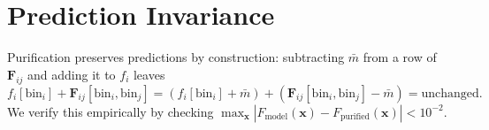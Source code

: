 \section{Prediction Invariance}

Purification preserves predictions by construction: subtracting $\bar{m}$ from a row of $\mathbf{F}_{ij}$ and adding it to $f_i$ leaves
\[
    f_i[\text{bin}_i] + \mathbf{F}_{ij}[\text{bin}_i, \text{bin}_j] = (f_i[\text{bin}_i] + \bar{m}) + (\mathbf{F}_{ij}[\text{bin}_i, \text{bin}_j] - \bar{m}) = \text{unchanged}.
\]
We verify this empirically by checking $\max_{\mathbf{x}} |F_{\text{model}}(\mathbf{x}) - F_{\text{purified}}(\mathbf{x})| < 10^{-2}$.
